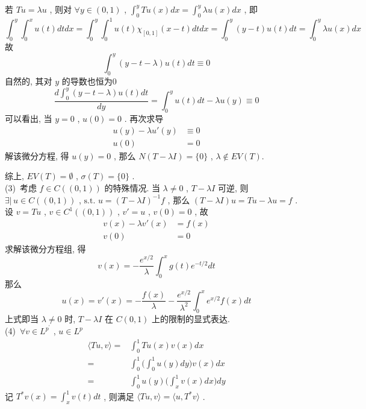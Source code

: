 \documentclass[a4paper, UTF8]{ctexart}				%
\numberwithin{equation}{section}				%
\begin{document}
        若 $Tu = \lambda u$ , 则对 $\forall y \in (0, 1)$ , $\int^y_0 Tu(x)dx = \int^y_0 \lambda u(x)dx$ , 即 
        \[
             \int^y_0 \int^x_0 u(t)dt dx = \int^y_0 \int^1_0 u(t)\chi_{[0,1]}(x-t)dt dx = \int^y_0 (y - t) u(t) dt = \int^y_0 \lambda u(x) dx
        \]
        故 
        \[
            \int^y_0 (y-t-\lambda) u(t) dt \equiv 0
        \]
        自然的, 其对 $y$ 的导数也恒为0 
        \[
            \frac{d \int^y_0 (y-t-\lambda) u(t) dt}{dy} = \int^y_0 u(t) dt - \lambda u(y) \equiv 0
        \]
        可以看出, 当 $y = 0$ , $u(0) = 0$ . 再次求导 
        \begin{equation*}
            \begin{split}
                u(y) - \lambda u'(y) & \equiv 0\\
                u(0) & = 0
            \end{split}
        \end{equation*}
        解该微分方程, 得 $u(y) = 0$ , 那么 $N(T - \lambda I) = \{0\}$ , $\lambda \notin EV(T)$.
        
        综上, $EV(T) = \emptyset$ , $\sigma(T) = \{0\}$ .\\

        \noindent (3) \,考虑 $f \in C((0, 1))$ 的特殊情况. 当 $\lambda \neq 0$ , $T - \lambda I$ 可逆, 则 $\exists |\, u \in C((0, 1))$ , $\text{s.t. } u = (T - \lambda I)^{-1} f$ , 那么 $(T - \lambda I)u = Tu - \lambda u = f$ . 设 $v = T u$ , $v \in C^1((0, 1))$ , $v' = u$ , $v(0) = 0$ , 故 
        \begin{equation*}
            \begin{split}
                v(x) - \lambda v'(x) & = f(x)\\
                v(0) & = 0
            \end{split}
        \end{equation*}
         求解该微分方程组, 得 
         \[
             v(x) = -\frac{e^{x/2}}{\lambda} \int^x_0 g(t) e^{-t/2} dt
         \]
         那么 
         \[
             u(x) = v'(x) = -\frac{f(x)}{\lambda}-\frac{e^{x/2}}{\lambda^2}\int^x_0 e^{x/2} f(x) dt
         \]
         上式即当 $\lambda \neq 0$ 时, $T - \lambda I$ 在 $C(0, 1)$ 上的限制的显式表达.\\

         \noindent (4) \,$\forall v \in L^{p^{'}}$ , $u \in L^p$
         \begin{equation*}
             \begin{split}
                    \langle{Tu},{v}\rangle
                 =  & \int^1_0 Tu(x) v(x) dx\\
                 =  & \int^1_0 \Big( \int^1_0 u(y) dy \Big) v(x) dx\\
                 =  & \int^1_0 u(y) \Big( \int^1_x v(x) dx \Big) dy
             \end{split}
         \end{equation*}
         记 $T^*v(x) = \int^1_x v(t)dt$ , 则满足 $\langle{Tu},{v}\rangle = \langle{u},{T^*v}\rangle$ .
\end{document}
